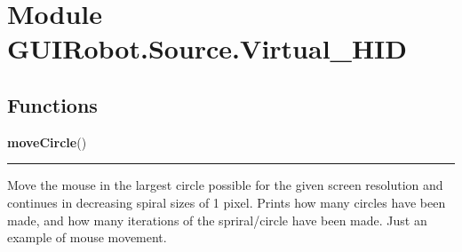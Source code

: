 %
%
%


\section{Module GUIRobot.Source.Virtual\_HID}

    \label{GUIRobot:Source:Virtual_HID}


  \subsection{Functions}

    \label{GUIRobot:Source:Virtual_HID:moveCircle}

    \vspace{0.5ex}

\hspace{.8\funcindent}\begin{boxedminipage}{\funcwidth}

    \raggedright \textbf{moveCircle}()

    \vspace{-1.5ex}

    \rule{\textwidth}{0.5\fboxrule}
\setlength{\parskip}{2ex}
    Move the mouse in the largest circle possible for the given screen 
    resolution and continues in decreasing spiral sizes of 1 pixel. Prints 
    how many circles have been made, and how many iterations of the 
    spriral/circle have been made. Just an example of mouse movement.

\setlength{\parskip}{1ex}
    \end{boxedminipage}


